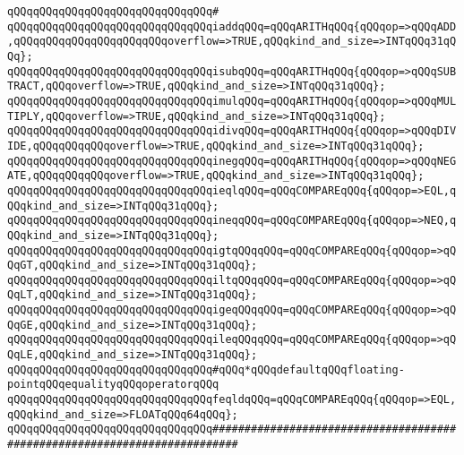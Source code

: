 \verb|qQQqqQQqqQQqqQQqqQQqqQQqqQQqqQQq#|\newline
\verb|qQQqqQQqqQQqqQQqqQQqqQQqqQQqqQQqiaddqQQq=qQQqARITHqQQq{qQQqop=>qQQqADD,qQQqqQQqqQQqqQQqqQQqqQQqoverflow=>TRUE,qQQqkind_and_size=>INTqQQq31qQQq};|\newline
\verb|qQQqqQQqqQQqqQQqqQQqqQQqqQQqqQQqisubqQQq=qQQqARITHqQQq{qQQqop=>qQQqSUBTRACT,qQQqoverflow=>TRUE,qQQqkind_and_size=>INTqQQq31qQQq};|\newline
\verb|qQQqqQQqqQQqqQQqqQQqqQQqqQQqqQQqimulqQQq=qQQqARITHqQQq{qQQqop=>qQQqMULTIPLY,qQQqoverflow=>TRUE,qQQqkind_and_size=>INTqQQq31qQQq};|\newline
\verb|qQQqqQQqqQQqqQQqqQQqqQQqqQQqqQQqidivqQQq=qQQqARITHqQQq{qQQqop=>qQQqDIVIDE,qQQqqQQqqQQqoverflow=>TRUE,qQQqkind_and_size=>INTqQQq31qQQq};|\newline
\verb|qQQqqQQqqQQqqQQqqQQqqQQqqQQqqQQqinegqQQq=qQQqARITHqQQq{qQQqop=>qQQqNEGATE,qQQqqQQqqQQqoverflow=>TRUE,qQQqkind_and_size=>INTqQQq31qQQq};|\newline
\newline
\verb|qQQqqQQqqQQqqQQqqQQqqQQqqQQqqQQqieqlqQQq=qQQqCOMPAREqQQq{qQQqop=>EQL,qQQqkind_and_size=>INTqQQq31qQQq};|\newline
\verb|qQQqqQQqqQQqqQQqqQQqqQQqqQQqqQQqineqqQQq=qQQqCOMPAREqQQq{qQQqop=>NEQ,qQQqkind_and_size=>INTqQQq31qQQq};|\newline
\verb|qQQqqQQqqQQqqQQqqQQqqQQqqQQqqQQqigtqQQqqQQq=qQQqCOMPAREqQQq{qQQqop=>qQQqGT,qQQqkind_and_size=>INTqQQq31qQQq};|\newline
\verb|qQQqqQQqqQQqqQQqqQQqqQQqqQQqqQQqiltqQQqqQQq=qQQqCOMPAREqQQq{qQQqop=>qQQqLT,qQQqkind_and_size=>INTqQQq31qQQq};|\newline
\verb|qQQqqQQqqQQqqQQqqQQqqQQqqQQqqQQqigeqQQqqQQq=qQQqCOMPAREqQQq{qQQqop=>qQQqGE,qQQqkind_and_size=>INTqQQq31qQQq};|\newline
\verb|qQQqqQQqqQQqqQQqqQQqqQQqqQQqqQQqileqQQqqQQq=qQQqCOMPAREqQQq{qQQqop=>qQQqLE,qQQqkind_and_size=>INTqQQq31qQQq};|\newline
\newline
\verb|qQQqqQQqqQQqqQQqqQQqqQQqqQQqqQQq#qQQq*qQQqdefaultqQQqfloating-pointqQQqequalityqQQqoperatorqQQq|\newline
\verb|qQQqqQQqqQQqqQQqqQQqqQQqqQQqqQQqfeqldqQQq=qQQqCOMPAREqQQq{qQQqop=>EQL,qQQqkind_and_size=>FLOATqQQq64qQQq};|\newline
\newline
\verb|qQQqqQQqqQQqqQQqqQQqqQQqqQQqqQQq##########################################################################|\newline
